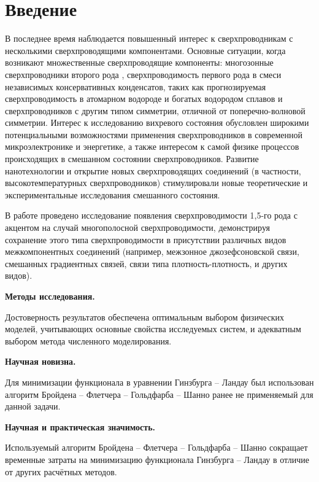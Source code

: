 \chapter*{Введение}

В последнее время наблюдается повышенный интерес к сверхпроводникам с 
несколькими сверхпроводящими компонентами. Основные ситуации, когда возникают 
множественные сверхпроводящие компоненты: многозонные сверхпроводники второго 
рода \cite{bib:6,bib:7,bib:8,bib:9,bib:10,bib:11}, сверхпроводимость первого 
рода в смеси независимых консервативных конденсатов, таких как прогнозируемая 
сверхпроводимость в атомарном водороде и богатых водородом сплавов 
\cite{bib:12.1,bib:12.2,bib:13,bib:14} и сверхпроводников с другим типом 
симметрии, отличной от поперечно-волновой симметрии. Интерес к исследованию 
вихревого состояния обусловлен широкими потенциальными возможностями 
применения сверхпроводников в современной микроэлектронике и энергетике, а 
также интересом к самой физике процессов происходящих в смешанном состоянии 
сверхпроводников. Развитие нанотехнологии и открытие новых сверхпроводящих 
соединений (в частности, высокотемпературных сверхпроводников) стимулировали 
новые теоретические и экспериментальные исследования смешанного состояния. 

В работе проведено исследование появления сверхпроводимости 1,5-го рода с 
акцентом на случай многополосной сверхпроводимости, демонстрируя сохранение 
этого типа сверхпроводимости в присутствии различных видов межкомпонентных 
соединений (например, межзонное джозефсоновской связи, смешанных градиентных 
связей, связи типа плотность-плотность, и других видов).

\textbf{Методы исследования.}

Достоверность результатов обеспечена оптимальным выбором физических моделей, 
учитывающих основные свойства исследуемых систем, и адекватным выбором метода 
численного моделирования.

\textbf{Научная новизна.}

Для минимизации функционала в уравнении Гинзбурга -- Ландау был использован 
алгоритм Бройдена -- Флетчера -- Гольдфарба -- Шанно ранее не применяемый для 
данной задачи.

\textbf{Научная и практическая значимость.}

Используемый алгоритм Бройдена -- Флетчера -- Гольдфарба -- Шанно сокращает 
временные затраты на минимизацию функционала Гинзбурга -- Ландау в отличие от 
других расчётных методов.

\newpage
